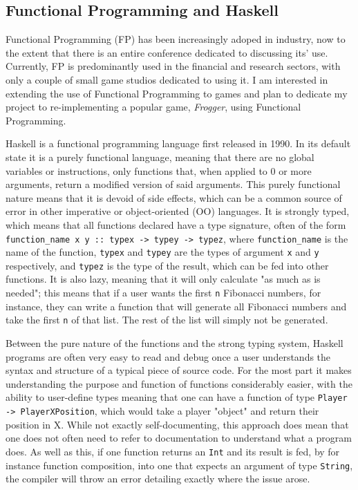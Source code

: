 \documentclass[12pt, a4paper]{report}
\begin{document}
\subsection{Functional Programming and Haskell}
Functional Programming (FP) has been increasingly adoped in industry, now to the extent that there is an entire conference dedicated to discussing its' use\cite{cufp}.
Currently, FP is predominantly used in the financial and research sectors, with only a couple of small game studios dedicated to using it.
I am interested in extending the use of Functional Programming to games and plan to dedicate my project to re-implementing a popular game, \textit{Frogger}, using Functional Programming.
\par
Haskell is a functional programming language first released in 1990.
In its default state it is a purely functional language, meaning that there are no global variables or instructions, only functions that, when applied to 0 or more arguments, return a modified version of said arguments.
This purely functional nature means that it is devoid of side effects, which can be a common source of error in other imperative or object-oriented (OO) languages.
It is strongly typed\cite{haskellsite}, which means that all functions declared have a type signature, often of the form \verb|function_name x y :: typex -> typey -> typez|, where \verb|function_name| is the name of the function, \verb|typex| and \verb|typey| are the types of argument \verb|x| and \verb|y| respectively, and \verb|typez| is the type of the result, which can be fed into other functions.
It is also lazy\cite{haskellsite}, meaning that it will only calculate "as much as is needed"; this means that if a user wants the first \verb|n| Fibonacci numbers, for instance, they can write a function that will generate all Fibonacci numbers and take the first \verb|n| of that list.
The rest of the list will simply not be generated.
\par
Between the pure nature of the functions and the strong typing system, Haskell programs are often very easy to read and debug once a user understands the syntax and structure of a typical piece of source code.
For the most part it makes understanding the purpose and function of functions considerably easier, with the ability to user-define types meaning that one can have a function of type \verb|Player -> PlayerXPosition|, which would take a player "object" and return their position in X.
While not exactly self-documenting, this approach does mean that one does not often need to refer to documentation to understand what a program does.
As well as this, if one function returns an \verb|Int| and its result is fed, by for instance function composition, into one that expects an argument of type \verb|String|, the compiler will throw an error detailing exactly where the issue arose.
\end{document}
